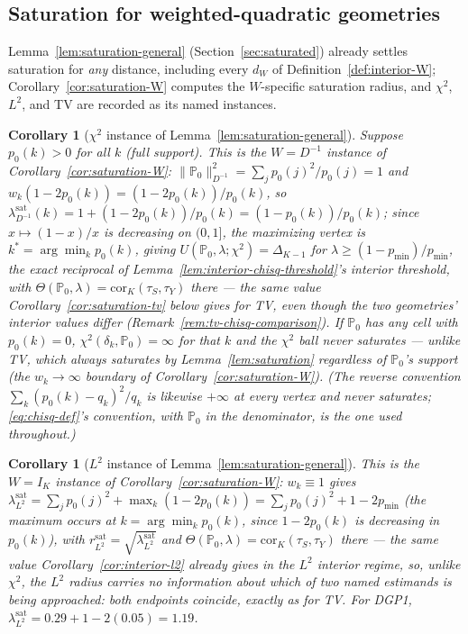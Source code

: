 \documentclass[11pt]{article}
\theoremstyle{plain}
\newtheorem{corollary}[theorem]{Corollary}
\theoremstyle{definition}
\theoremstyle{remark}
\newcommand{\PP}{\mathbb{P}}
\newcommand{\Corr}{\mathrm{cor}}
\begin{document}
\subsection{Saturation for weighted-quadratic geometries}

Lemma~\ref{lem:saturation-general} (Section~\ref{sec:saturated}) already settles
saturation for \emph{any} distance, including every $d_W$ of
Definition~\ref{def:interior-W}; Corollary~\ref{cor:saturation-W} computes the
$W$-specific saturation radius, and $\chi^2$, $L^2$, and TV are recorded as its named
instances.

\begin{corollary}[$\chi^2$ instance of Lemma~\ref{lem:saturation-general}]\label{cor:saturation-chisq}
Suppose $p_0(k)>0$ for all $k$ (full support). This is the $W=D^{-1}$ instance of
Corollary~\ref{cor:saturation-W}: $\|\PP_0\|_{D^{-1}}^2=\sum_jp_0(j)^2/p_0(j)=1$ and
$w_k(1-2p_0(k))=(1-2p_0(k))/p_0(k)$, so
$\lambda^{\mathrm{sat}}_{D^{-1}}(k)=1+(1-2p_0(k))/p_0(k)=(1-p_0(k))/p_0(k)$; since
$x\mapsto(1-x)/x$ is decreasing on $(0,1]$, the maximizing vertex is
$k^*=\arg\min_kp_0(k)$, giving $U(\PP_0,\lambda;\chi^2)=\Delta_{K-1}$ for
$\lambda\ge(1-p_{\min})/p_{\min}$, the exact reciprocal of
Lemma~\ref{lem:interior-chisq-threshold}'s interior threshold, with
$\Theta(\PP_0,\lambda)=\Corr_K(\tau_S,\tau_Y)$ there --- the same value
Corollary~\ref{cor:saturation-tv} below gives for TV, even though the two geometries'
\emph{interior} values differ (Remark~\ref{rem:tv-chisq-comparison}). If $\PP_0$ has
any cell with $p_0(k)=0$, $\chi^2(\delta_k,\PP_0)=\infty$ for that $k$ and the $\chi^2$
ball never saturates --- unlike TV, which always saturates by Lemma~\ref{lem:saturation}
regardless of $\PP_0$'s support (the $w_k\to\infty$ boundary of
Corollary~\ref{cor:saturation-W}). (The reverse convention
$\sum_k(p_0(k)-q_k)^2/q_k$ is likewise $+\infty$ at every vertex and never saturates;
\eqref{eq:chisq-def}'s convention, with $\PP_0$ in the denominator, is the one used
throughout.)
\end{corollary}

\begin{corollary}[$L^2$ instance of Lemma~\ref{lem:saturation-general}]\label{cor:saturation-l2}
This is the $W=I_K$ instance of Corollary~\ref{cor:saturation-W}: $w_k\equiv1$ gives
$\lambda^{\mathrm{sat}}_{L^2}=\sum_jp_0(j)^2+\max_k(1-2p_0(k))=\sum_jp_0(j)^2+1-2p_{\min}$
(the maximum occurs at $k=\arg\min_kp_0(k)$, since $1-2p_0(k)$ is decreasing in
$p_0(k)$), with $r^{\mathrm{sat}}_{L^2}=\sqrt{\lambda^{\mathrm{sat}}_{L^2}}$ and
$\Theta(\PP_0,\lambda)=\Corr_K(\tau_S,\tau_Y)$ there --- the same value
Corollary~\ref{cor:interior-l2} already gives in the $L^2$ interior regime, so, unlike
$\chi^2$, the $L^2$ radius carries no information about which of two named estimands is
being approached: both endpoints coincide, exactly as for TV. For DGP1,
$\lambda^{\mathrm{sat}}_{L^2}=0.29+1-2(0.05)=1.19$.
\end{corollary}
\end{document}
